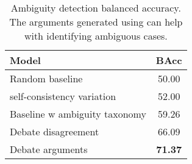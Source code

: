 \begin{table}
\centering
\begin{tabular}{l|S[table-format = 2.1]}
\toprule
\textbf{Model}  & \textbf{BAcc}
\\ 
\midrule
Random baseline & 50.00
\\
self-consistency variation & 52.00
\\
Baseline w ambiguity taxonomy & 59.26
\\
Debate disagreement& 66.09
\\
Debate arguments & \bfseries 71.37 \\
\bottomrule
\end{tabular}
\caption{Ambiguity detection balanced accuracy. The arguments generated using \method can help with identifying ambiguous cases.}
\label{tab:ambiguity_results}
\end{table}